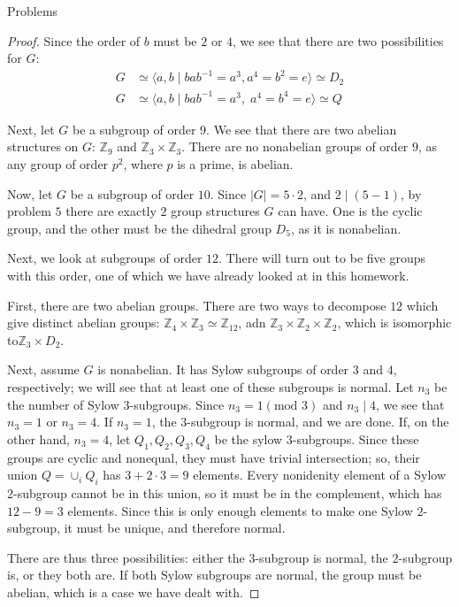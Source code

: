 \documentclass[12pt]{article}
\newcommand{\Z}{\mathbb{Z}}
\theoremstyle{definition}
\newenvironment{problem}[2][Problem]{\begin{trivlist}
\item[\hskip \labelsep {\bfseries #1}\hskip \labelsep {\bfseries #2.}]}{\end{trivlist}}
\begin{document}
\begin{section}{Problems}
\begin{problem}{16}
\begin{proof}
		\par Since the order of $b$ must be $2$ or $4$, we see that there are two possibilities for $G$:
		\begin{align*}
		G  &\simeq \langle a, b \mid bab^{-1} = a^3, a^4 = b^2  = e\rangle \simeq D_2\\
		    G &\simeq \langle a, b \mid bab^{-1} = a^3, \; a^4 = b^4 = e\rangle \simeq Q
		\end{align*}
		\par Next, let $G$ be a subgroup of order $9$. We see that there are two abelian structures on $G$: $\Z_9$ and $\Z_3 \times \Z_3$. There are no nonabelian groups of order $9$, as any group of order $p^2$, where $p$ is a prime, is abelian.
		\par Now, let $G$ be a subgroup of order $10$. Since $\lvert G \rvert = 5 \cdot 2$, and $2 \mid (5-1)$, by problem $5$ there are exactly $2$ group structures $G$ can have. One is the cyclic group, and the other must be the dihedral group $D_5$, as it is nonabelian.
		\par Next, we look at subgroups of order $12$. There will turn out to be five groups with this order, one of which we have already looked at in this homework. 
		\par First, there are two abelian groups. There are two ways to decompose $12$ which give distinct abelian groups: $\Z_{4} \times \Z_3 \simeq \Z_{12}$, adn $\Z_{3} \times \Z_{2}\times \Z_2$, which is isomorphic to$ \Z_3 \times D_2$. 
		\par Next, assume $G$ is nonabelian. It has Sylow subgroups of order $3$ and $4$, respectively; we will see that at least one of these subgroups is normal. Let $n_3$ be the number of Sylow $3$-subgroups. Since $n_3 = 1 (\text{mod }3)$ and $n_3 \mid 4$, we see that $n_3 = 1$ or $n_3 = 4$. If $n_3 = 1$, the $3$-subgroup is normal, and we are done. If, on the other hand, $n_3 = 4$, let $Q_1, Q_2, Q_3, Q_4$ be the sylow $3$-subgroups. Since these groups are cyclic and nonequal, they must have trivial intersection; so, their union $Q = \cup_i Q_i$ has $3 + 2 \cdot 3 = 9$ elements. Every nonidenity element of a Sylow $2$-subgroup cannot be in this union, so it must be in the complement, which has $12 - 9 = 3$ elements. Since this is only enough elements to make one Sylow $2$-subgroup, it must be unique, and therefore normal.
		\par There are thus three possibilities: either the $3$-subgroup is normal, the $2$-subgroup is, or they both are. If both Sylow subgroups are normal, the group must be abelian, which is a case we have dealt with.

\end{proof}
\end{problem}
\end{section}
\end{document}

